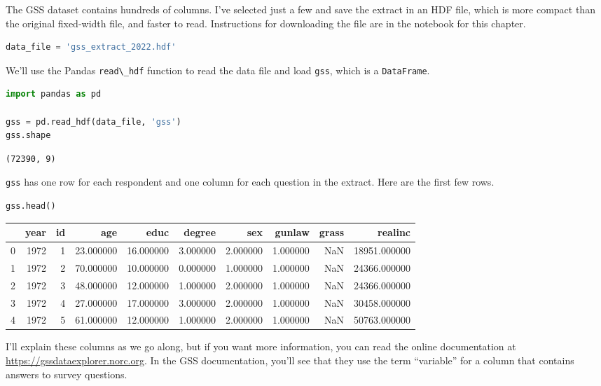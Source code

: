 The GSS dataset contains hundreds of columns. I've selected just a few
and save the extract in an HDF file, which is more compact than the
original fixed-width file, and faster to read. Instructions for
downloading the file are in the notebook for this chapter.

\begin{lstlisting}[language=Python,style=source]
data_file = 'gss_extract_2022.hdf'
\end{lstlisting}

We'll use the Pandas \passthrough{\lstinline!read\_hdf!} function to
read the data file and load \passthrough{\lstinline!gss!}, which is a
\passthrough{\lstinline!DataFrame!}.

\begin{lstlisting}[language=Python,style=source]
import pandas as pd

gss = pd.read_hdf(data_file, 'gss')
gss.shape
\end{lstlisting}

\begin{lstlisting}[style=output]
(72390, 9)
\end{lstlisting}

\passthrough{\lstinline!gss!} has one row for each respondent and one
column for each question in the extract. Here are the first few rows.

\begin{lstlisting}[language=Python,style=source]
gss.head()
\end{lstlisting}

\begin{tabular}{lrrrrrrrrr}
\midrule
 & year & id & age & educ & degree & sex & gunlaw & grass & realinc \\
\midrule
0 & 1972 & 1 & 23.000000 & 16.000000 & 3.000000 & 2.000000 & 1.000000 & NaN & 18951.000000 \\
1 & 1972 & 2 & 70.000000 & 10.000000 & 0.000000 & 1.000000 & 1.000000 & NaN & 24366.000000 \\
2 & 1972 & 3 & 48.000000 & 12.000000 & 1.000000 & 2.000000 & 1.000000 & NaN & 24366.000000 \\
3 & 1972 & 4 & 27.000000 & 17.000000 & 3.000000 & 2.000000 & 1.000000 & NaN & 30458.000000 \\
4 & 1972 & 5 & 61.000000 & 12.000000 & 1.000000 & 2.000000 & 1.000000 & NaN & 50763.000000 \\
\midrule
\end{tabular}

I'll explain these columns as we go along, but if you want more
information, you can read the online documentation at
\url{https://gssdataexplorer.norc.org}. In the GSS documentation, you'll
see that they use the term ``variable'' for a column that contains
answers to survey questions.

